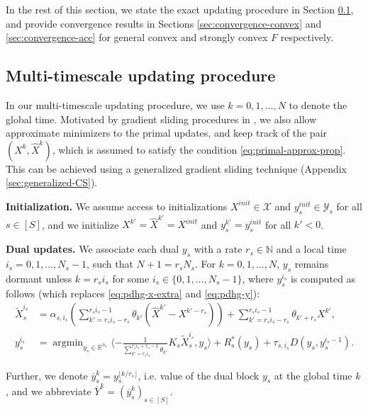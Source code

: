 \documentclass[10pt]{article}
\newcommand{\mc}{\mathcal}
\newcommand{\R}{\mathbb{R}}
\newcommand{\N}{\mathbb{N}}
\DeclareMathOperator*{\argmin}{argmin}
\begin{document}
In the rest of this section, we state the exact updating procedure in Section \ref{sec:update-proc}, and provide convergence results in Sections \ref{sec:convergence-convex} and \ref{sec:convergence-acc} for general convex and strongly convex $F$ respectively. 



\subsection{Multi-timescale updating procedure}\label{sec:update-proc}

In our multi-timescale updating procedure, we use $k=0,1,\ldots,N$ to denote the global time. Motivated by gradient sliding procedures in \cite{lan_communication-efficient_2020}, we also allow approximate minimizers to the primal updates, and keep track of the pair $(X^k, \widehat{X}^k)$, which is assumed to satisfy the condition \eqref{eq:primal-approx-prop}. This can be achieved using a generalized gradient sliding technique (Appendix \ref{sec:generalized-CS}). 


 \textbf{Initialization.} We assume access to initializations $X^{init}\in \mc X$ and $y_s^{init}\in \mc Y_s$ for all $s\in [S]$, and we initialize $X^{k'} = \widehat{X}^{k'}=X^{init}$ and $y_s^{k'} = y_s^{init}$ for all $k'<0$. 

{\color{blue}\textbf{Dual updates.}} We associate each dual $y_s$ with a rate $r_s\in \N$ and a local time $i_s=0,1,\ldots,N_s-1$, such that $N+1 = r_sN_s$. For $k=0,1,\ldots,N$, $y_s$ remains dormant unless $k = r_si_s$ for some $i_s\in \{0,1,\ldots,N_s-1\}$, where $y^{i_s}_s$ is computed as follows (which replaces \eqref{eq:pdhg-x-extra} and \eqref{eq:pdhg-y}):
\begin{subequations}\label{eq:novel-dual}
    \begin{align}
        \widetilde{X}_{s}^{i_s} &=\alpha_{s,i_s}\left(\sum_{k'=r_si_s-r_s}^{r_si_s-1}\theta_{k'}(\widehat{X}^{k'} - X^{k'-r_s})\right) + \sum_{k'=r_si_s-r_s}^{r_si_s-1}\theta_{k'+r_s}X^{k'},\label{eq:update_x_tilde}\\
    y_s^{i_s} &= \argmin_{y_s\in \R^{n_s}} \langle - \frac{1}{\sum_{k'=r_si_s}^{r_si_s+r_s-1}\theta_{k'}}K_{s}\widetilde{X}_{s}^{i_s},y_s\rangle + R^*_s(y_s) + \tau_{s,i_s}D(y_s ,y^{i_s-1}_s).\label{eq:update_y}
    \end{align}
\end{subequations}

Further, we denote $\overline{y}_s^k=y_s^{\lfloor k/r_s\rfloor}$, i.e. value of the dual block $y_s$ at the global time $k$, and we abbreviate $\overline{Y}^k = (\overline{y}_s^k)_{s\in [S]}$. 
\end{document}
